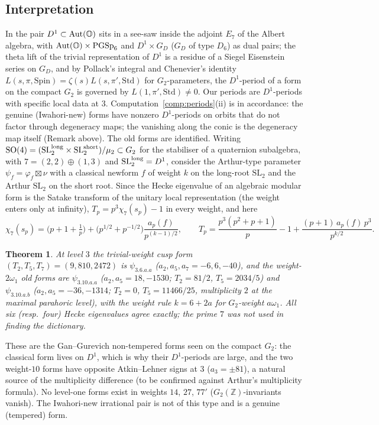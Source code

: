 \documentclass[11pt]{amsart}
\newtheorem{theorem}{Theorem}[section]
\theoremstyle{definition}
\renewcommand{\O}{\mathbb{O}}\newcommand{\Sd}{\mathbb{S}}\newcommand{\Hq}{\mathbb{H}}\newcommand{\Z}{\mathbb{Z}}\newcommand{\Q}{\mathbb{Q}}\newcommand{\R}{\mathbb{R}}\newcommand{\C}{\mathbb{C}}\newcommand{\F}{\mathbb{F}}
\begin{document}
\subsection{Interpretation}
In \cite{GanSavin} the pair $D^1\subset\Aut(\O)$ sits in a see-saw inside the adjoint $E_7$ of the Albert algebra, with $\Aut(\O)\times\mathrm{PGSp}_6$ and $D^1\times G_D$ ($G_D$ of type $D_6$) as dual pairs; the theta lift of the trivial representation of $D^1$ is a residue of a Siegel Eisenstein series on $G_D$, and by Pollack's integral and Chenevier's identity $L(s,\pi,\mathrm{Spin})=\zeta(s)L(s,\pi',\mathrm{Std})$ for $G_2$-parameters, the $D^1$-period of a form on the compact $G_2$ is governed by $L(1,\pi',\mathrm{Std})\ne 0$. Our periods are $D^1$-periods with specific local data at $3$. Computation~\ref{comp:periods}(ii) is in accordance: the genuine (Iwahori-new) forms have nonzero $D^1$-periods on orbits that do not factor through degeneracy maps; the vanishing along the conic is the degeneracy map itself (Remark above). The old forms are identified. Writing $\mathrm{SO}(4)=(\mathrm{SL}_2^{\rm long}\times\mathrm{SL}_2^{\rm short})/\mu_2\subset G_2$ for the stabiliser of a quaternion subalgebra, with $7=(2,2)\oplus(1,3)$ and $\mathrm{SL}_2^{\rm long}=D^1$, consider the Arthur-type parameter $\psi_f=\varphi_f\boxtimes\nu$ with a classical newform $f$ of weight $k$ on the long-root $\mathrm{SL}_2$ and the Arthur $\mathrm{SL}_2$ on the short root. Since the Hecke eigenvalue of an algebraic modular form is the Satake transform of the unitary local representation (the weight enters only at infinity), $T_p=p^3\chi_7(s_p)-1$ in every weight, and here
\[\chi_7(s_p)=\Big(p+1+\tfrac1p\Big)+\big(p^{1/2}+p^{-1/2}\big)\frac{a_p(f)}{p^{(k-1)/2}},\qquad T_p=\frac{p^3(p^2+p+1)}{p}-1+\frac{(p+1)\,a_p(f)\,p^3}{p^{k/2}}.\]
\begin{theorem}\label{thm:lifts}
At level $3$ the trivial-weight cusp form $(T_2,T_5,T_7)=(9,810,2472)$ is $\psi_{3.6.a.a}$ ($a_2,a_5,a_7=-6,6,-40$), and the weight-$2\omega_1$ old forms are $\psi_{3.10.a.a}$ ($a_2,a_5=18,-1530$; $T_2=81/2$, $T_5=2034/5$) and $\psi_{3.10.a.b}$ ($a_2,a_5=-36,-1314$; $T_2=0$, $T_5=11466/25$, multiplicity $2$ at the maximal parahoric level), with the weight rule $k=6+2a$ for $G_2$-weight $a\omega_1$. All six (resp.\ four) Hecke eigenvalues agree exactly; the prime $7$ was not used in finding the dictionary.
\end{theorem}
These are the Gan--Gurevich non-tempered forms \cite{GG06} seen on the compact $G_2$: the classical form lives on $D^1$, which is why their $D^1$-periods are large, and the two weight-$10$ forms have opposite Atkin--Lehner signs at $3$ ($a_3=\pm 81$), a natural source of the multiplicity difference (to be confirmed against Arthur's multiplicity formula). No level-one forms exist in weights $14$, $27$, $77'$ ($G_2(\Z)$-invariants vanish). The Iwahori-new irrational pair is not of this type and is a genuine (tempered) form.
\end{document}
